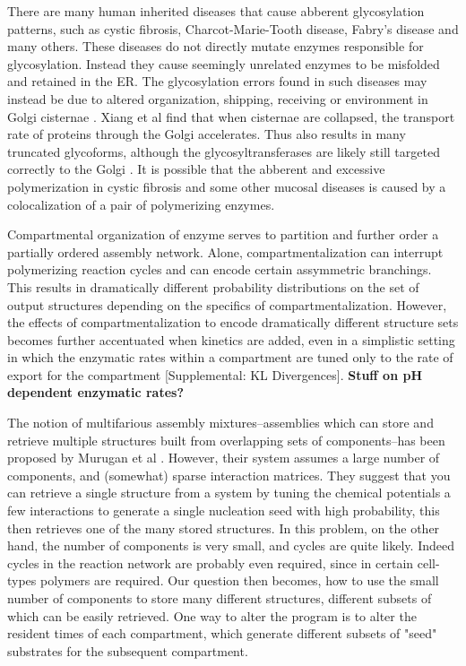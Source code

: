 \documentclass[twocolumn]{article}
\begin{document}
There are many human inherited diseases that cause abberent glycosylation patterns, such as cystic fibrosis, Charcot-Marie-Tooth disease, Fabry's disease and many others. These diseases do not directly mutate enzymes responsible for glycosylation. Instead they cause seemingly unrelated enzymes to be misfolded and retained in the ER. The glycosylation errors found in such diseases may instead be due to altered organization, shipping, receiving or environment in Golgi cisternae \cite{Freeze2011}. Xiang et al find that when cisternae are collapsed, the transport rate of proteins through the Golgi accelerates. Thus also results in many truncated glycoforms, although the glycosyltransferases are likely still targeted correctly to the Golgi \cite{Xiang2012}. It is possible that the abberent and excessive polymerization in cystic fibrosis and some other mucosal diseases is caused by a colocalization of a pair of polymerizing enzymes. 

Compartmental organization of enzyme serves to partition and further order a partially ordered assembly network. Alone, compartmentalization can interrupt polymerizing reaction cycles and can encode certain assymmetric branchings. This results in dramatically different probability distributions on the set of output structures depending on the specifics of compartmentalization. However, the effects of compartmentalization to encode dramatically different structure sets becomes further accentuated when kinetics are added, even in a simplistic setting in which the enzymatic rates within a compartment are tuned only to the rate of export for the compartment [Supplemental: KL Divergences]. \textbf{Stuff on pH dependent enzymatic rates?}

The notion of multifarious assembly mixtures--assemblies which can store and retrieve multiple structures built from overlapping sets of components--has been proposed by Murugan et al \cite{Brenner2015}. However, their system assumes a large number of components, and (somewhat) sparse interaction matrices. They suggest that you can retrieve a single structure from a system by tuning the chemical potentials a few interactions to generate a single nucleation seed with high probability, this then retrieves one of the many stored structures. In this problem, on the other hand, the number of components is very small, and cycles are quite likely. Indeed cycles in the reaction network are probably even required, since in certain cell-types polymers are required. Our question then becomes, how to use the small number of components to store many different structures, different subsets of which can be easily retrieved. One way to alter the program is to alter the resident times of each compartment, which generate different subsets of "seed" substrates for the subsequent compartment. 
\end{document}

